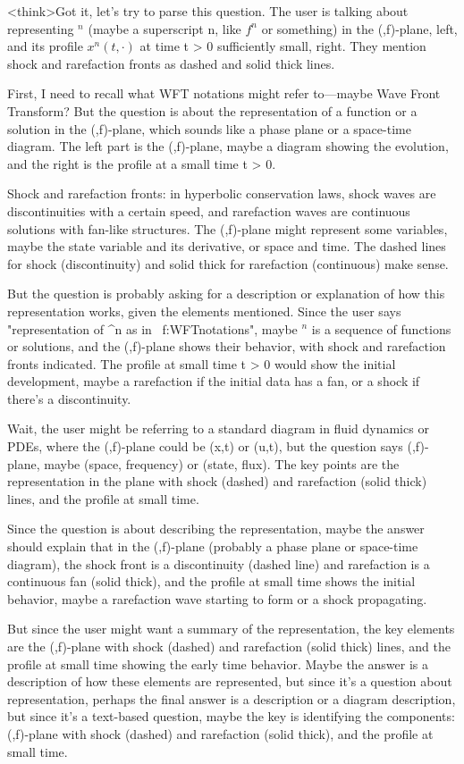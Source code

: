 <think>Got it, let's try to parse this question. The user is talking about representing \( ^n \) (maybe a superscript n, like \( f^n \) or something) in the (,f)-plane, left, and its profile \( x^n(t, \cdot) \) at time t > 0 sufficiently small, right. They mention shock and rarefaction fronts as dashed and solid thick lines. 

First, I need to recall what WFT notations might refer to—maybe Wave Front Transform? But the question is about the representation of a function or a solution in the (,f)-plane, which sounds like a phase plane or a space-time diagram. The left part is the (,f)-plane, maybe a diagram showing the evolution, and the right is the profile at a small time t > 0. 

Shock and rarefaction fronts: in hyperbolic conservation laws, shock waves are discontinuities with a certain speed, and rarefaction waves are continuous solutions with fan-like structures. The (,f)-plane might represent some variables, maybe the state variable and its derivative, or space and time. The dashed lines for shock (discontinuity) and solid thick for rarefaction (continuous) make sense. 

But the question is probably asking for a description or explanation of how this representation works, given the elements mentioned. Since the user says "representation of ^n as in ~f:WFTnotations", maybe \( ^n \) is a sequence of functions or solutions, and the (,f)-plane shows their behavior, with shock and rarefaction fronts indicated. The profile at small time t > 0 would show the initial development, maybe a rarefaction if the initial data has a fan, or a shock if there's a discontinuity. 

Wait, the user might be referring to a standard diagram in fluid dynamics or PDEs, where the (,f)-plane could be (x,t) or (u,t), but the question says (,f)-plane, maybe (space, frequency) or (state, flux). The key points are the representation in the plane with shock (dashed) and rarefaction (solid thick) lines, and the profile at small time. 

Since the question is about describing the representation, maybe the answer should explain that in the (,f)-plane (probably a phase plane or space-time diagram), the shock front is a discontinuity (dashed line) and rarefaction is a continuous fan (solid thick), and the profile at small time shows the initial behavior, maybe a rarefaction wave starting to form or a shock propagating. 

But since the user might want a summary of the representation, the key elements are the (,f)-plane with shock (dashed) and rarefaction (solid thick) lines, and the profile at small time showing the early time behavior. Maybe the answer is a description of how these elements are represented, but since it's a question about representation, perhaps the final answer is a description or a diagram description, but since it's a text-based question, maybe the key is identifying the components: (,f)-plane with shock (dashed) and rarefaction (solid thick), and the profile at small time. 

